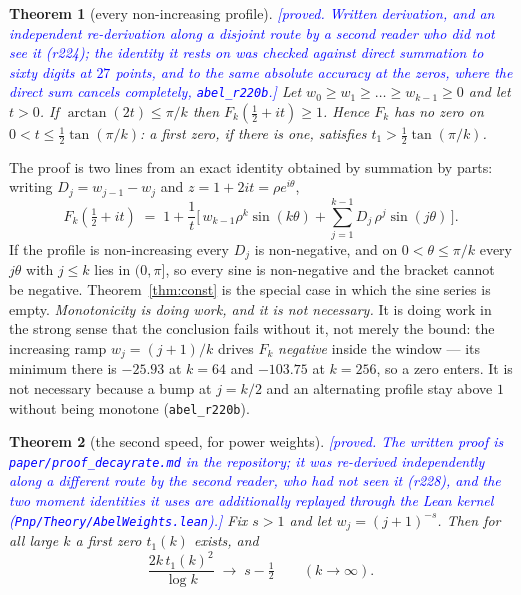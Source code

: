 \documentclass[11pt,a4paper]{article}
\theoremstyle{plain}
\newtheorem{theorem}{Theorem}[section]
\theoremstyle{definition}
\theoremstyle{remark}
\newcommand{\STATUS}[1]{\textcolor{blue}{\textsf{[#1]}}}
\begin{document}
\begin{theorem}[every non-increasing profile]\label{thm:monotone}
\STATUS{proved. Written derivation, and an independent re-derivation along a disjoint route
by a second reader who did not see it (r224); the identity it rests on was checked against
direct summation to sixty digits at $27$ points, and to the same absolute accuracy at the
zeros, where the direct sum cancels completely, \texttt{abel\_r220b}.}
Let $w_0\ge w_1\ge\dots\ge w_{k-1}\ge0$ and let $t>0$. If $\arctan(2t)\le\pi/k$ then
$F_k(\tfrac12+it)\ge1$. Hence $F_k$ has no zero on $0<t\le\tfrac12\tan(\pi/k)$: a first
zero, if there is one, satisfies $t_1>\tfrac12\tan(\pi/k)$.
\end{theorem}

The proof is two lines from an exact identity obtained by summation by parts: writing
$D_j=w_{j-1}-w_j$ and $z=1+2it=\rho e^{i\theta}$,
\begin{equation}\label{eq:abel}
  F_k(\tfrac12+it)\;=\;1+\frac1t\Big[\,w_{k-1}\rho^k\sin(k\theta)
    +\sum_{j=1}^{k-1}D_j\,\rho^j\sin(j\theta)\,\Big].
\end{equation}
If the profile is non-increasing every $D_j$ is non-negative, and on $0<\theta\le\pi/k$ every
$j\theta$ with $j\le k$ lies in $(0,\pi]$, so every sine is non-negative and the bracket cannot
be negative. Theorem~\ref{thm:const} is the special case in which the sine series is empty.
\emph{Monotonicity is doing work, and it is not necessary.} It is doing work in the strong
sense that the conclusion fails without it, not merely the bound: the increasing ramp
$w_j=(j+1)/k$ drives $F_k$ \emph{negative} inside the window --- its minimum there is
$-25.93$ at $k=64$ and $-103.75$ at $k=256$, so a zero enters. It is not necessary because a
bump at $j=k/2$ and an alternating profile stay above $1$ without being monotone
(\texttt{abel\_r220b}).

\begin{theorem}[the second speed, for power weights]\label{thm:decayrate}
\STATUS{proved. The written proof is \texttt{paper/proof\_decayrate.md} in the repository;
it was re-derived independently along a different route by the second reader, who had not
seen it (r228), and the two moment identities it uses are additionally replayed through the
Lean kernel (\texttt{Pnp/Theory/AbelWeights.lean}).}
Fix $s>1$ and let $w_j=(j+1)^{-s}$. Then for all large $k$ a first zero $t_1(k)$ exists, and
\[
  \frac{2k\,t_1(k)^2}{\log k}\;\longrightarrow\;s-\tfrac12\qquad(k\to\infty).
\]
\end{theorem}
\end{document}
